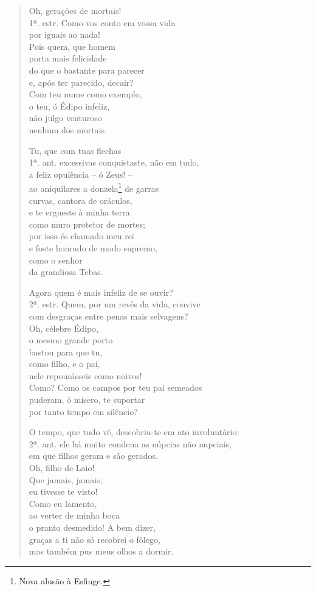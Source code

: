 \begin{verse}Oh, gerações de mortais!\\ 1ª. estr.
Como vos conto em vossa vida\\
por iguais ao nada!\\
Pois quem, que homem\\
porta mais felicidade\\ 
do que o bastante para parecer\\
e, após ter parecido, decair?\\
Com teu nume como exemplo,\\
o teu, ó Édipo infeliz,\\
não julgo venturoso\\
nenhum dos mortais.

Tu, que com tuas flechas\\ 1ª. ant.
excessivas conquistaste, não em tudo,\\
a feliz opulência -- ó Zeus! --\\
ao aniquilares a donzela\footnote{Nova alusão à Esfinge.} de garras\\
curvas, cantora de oráculos,\\
e te ergueste à minha terra\\ 
como muro protetor de mortes;\\
por isso és chamado meu rei\\
e foste honrado de modo supremo,\\
como o senhor\\
da grandiosa Tebas.

Agora quem é mais infeliz de se ouvir?\\ 2ª. estr.
Quem, por um revés da vida, convive\\
com desgraças entre penas mais selvagens?\\
Oh, célebre Édipo,\\
o mesmo grande porto\\
bastou para que tu,\\
como filho, e o pai,\\
nele repousásseis como noivos!\\ 
Como? Como os campos por teu pai semeados\\
puderam, ó mísero, te suportar\\
por tanto tempo em silêncio?

O tempo, que tudo vê, descobriu-te em ato involuntário;\\ 2ª. ant.
ele há muito condena as núpcias não nupciais,\\
em que filhos geram e são gerados.\\
Oh, filho de Laio!\\
Que jamais, jamais,\\
eu tivesse te visto!\\
Como eu lamento,\\
ao verter de minha boca\\
o pranto desmedido! A bem dizer,\\ 
graças a ti não só recobrei o fôlego,\\
mas também pus meus olhos a dormir.
\end{verse}


